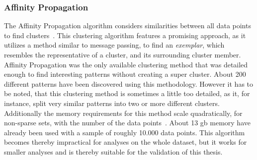 \subsubsection{Affinity Propagation}
The Affinity Propagation algorithm considers similarities between all data points to find clusters~\cite{article:affinity-propagation}.
This clustering algorithm features a promising approach, as it utilizes a method similar to message passing, to find an \emph{exemplar}, which resembles the representative of a cluster, and its surrounding cluster member.
Affinity Propagation was the only available clustering method that was detailed enough to find interesting patterns without creating a super cluster.
About 200 different patterns have been discovered using this methodology.
However it has to be noted, that this clustering method is sometimes a little too detailed, as it, for instance, split very similar patterns into two or more different clusters.
Additionally the memory requirements for this method scale quadratically, for non-sparse sets, with the number of the data points~\cite[p.~ii]{article:affinity-propagation}.
About 13 \ac{gb} memory have already been used with a sample of roughly 10.000 data points.
This algorithm becomes thereby impractical for analyses on the whole dataset, but it works for smaller analyses and is thereby suitable for the validation of this thesis.
